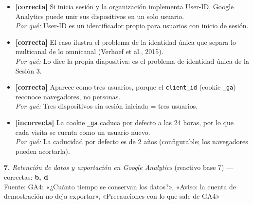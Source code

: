 \documentclass[10pt,letterpaper]{article}
\begin{document}
\begin{itemize}[leftmargin=1.2em,itemsep=0pt,topsep=1pt,parsep=0pt]
\item[\textbf{a)}] {\footnotesize \textbf{[correcta]} Si inicia sesión y la organización implementa User-ID, Google Analytics puede unir sus dispositivos en un solo usuario.\\ \textit{Por qué:} User-ID es un identificador propio para usuarios con inicio de sesión.}
\item[\textbf{b)}] {\footnotesize \textbf{[correcta]} El caso ilustra el problema de la identidad única que separa lo multicanal de lo omnicanal (Verhoef et al., 2015).\\ \textit{Por qué:} Lo dice la propia diapositiva: es el problema de identidad única de la Sesión 3.}
\item[\textbf{c)}] {\footnotesize \textbf{[correcta]} Aparece como tres usuarios, porque el \texttt{client\_id} (cookie \texttt{\_ga}) reconoce navegadores, no personas.\\ \textit{Por qué:} Tres dispositivos sin sesión iniciada = tres usuarios.}
\item[\textbf{d)}] {\footnotesize \textbf{[incorrecta]} La cookie \texttt{\_ga} caduca por defecto a las 24 horas, por lo que cada visita se cuenta como un usuario nuevo.\\ \textit{Por qué:} La caducidad por defecto es de 2 años (configurable; los navegadores pueden acortarla).}
\end{itemize}
\vspace{3pt}\noindent\textbf{7.} \textit{Retención de datos y exportación en Google Analytics} (reactivo base 7) — correctas: \textbf{b, d}\\[-1pt]
{\scriptsize Fuente: GA4: «¿Cuánto tiempo se conservan los datos?», «Aviso: la cuenta de demostración no deja exportar», «Precauciones con lo que sale de GA4»}
\end{document}
